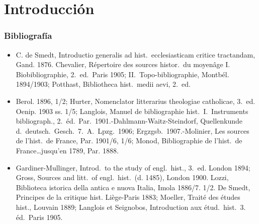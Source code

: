 \raggedbottom{} \documentclass[12pt]{book}
\begin{document}
\chapter{Introducción}
\subsection{Bibliografía}
\begin{itemize}


  \item C. de Smedt, Introductio generalis ad hist.\ ecclesiasticam critice tractandam, Gand. 1876. Chevalier, Répertoire des sources histor.\ du moyenâge I. Biobibliographie, 2.\ ed.\ Paris 1905; II.\ Topo-bibliographie, Montbél. 1894/1903; Potthast, Bibliotheca hist.\ medii aevi, 2.\ ed.
  \item Berol. 1896, 1/2; Hurter, Nomenclator litterarius theologiae catholicae, 3.\ ed. Oenip. 1903 ss. 1/5; Langlois, Manuel de bibliographie hist.\ I.\ Instruments bibliograph., 2.\ éd.\ Par.\ 1901.-Dahlmann-Waitz-Steindorf, Quellenkunde d.\ deutsch.\ Gesch.\ 7.\ A.\ Lpzg.\ 1906; Ergzgsb.\ 1907.-Molinier, Les sources de l'hist.\ de France, Par. 1901/6, 1/6; Monod, Bibliographie de l'hist.\ de France\ldots jusqu'en 1789, Par. 1888.
  \item Gardiner-Mullinger, Introd.\ to the study of engl.\ hist., 3.\ ed. London 1894; Gross, Sources and litt.\ of engl.\ hist.\ (d. 1485), London 1900. Lozzi, Biblioteca istorica della antica e nuova Italia, Imola 1886/7. 1/2. De Smedt, Principes de la critique hist. Liège-Paris 1883; Moeller, Traité des études hist., Louvain 1889; Langlois et Seignobos, Introduction aux étud.\ hist.\ 3. éd.\ Paris 1905.
\end{itemize}
\end{document}
